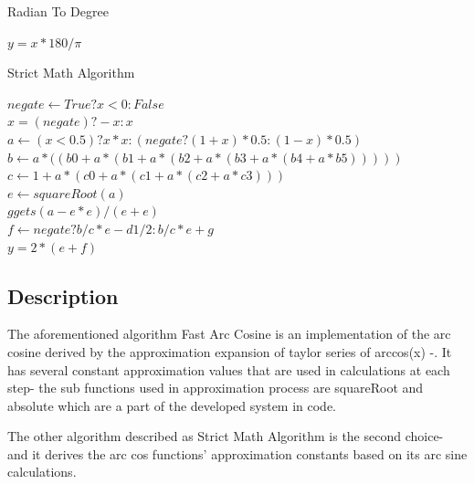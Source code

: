 \documentclass[a4paper,12pt]{article}
\begin{document}
    \begin{algorithm}
    \caption{Radian To Degree}
    $y = x * 180/\pi$\;
    \end{algorithm}
    
    \begin{algorithm}
    \caption{Strict Math Algorithm \cite{Strict Math}}
    $negate \gets True ? x < 0 : False$\\
    $x = (negate) ? -x: x$\\
   $a \gets (x < 0.5) ? x*x : (negate ? (1+x)*0.5 : (1-x)*0.5)$
   \\
   $b \gets a * ((b0 + a * (b1 + a * (b2 + a * (b3 + a * (b4 + a * b5))))) $
   \\
   $c \gets 1 + a * (c0 + a * (c1 + a * (c2 + a * c3)))$ 
   \newline    
   \\
   $e \gets squareRoot(a)$\\
   $g gets (a - e * e) / (e + e)$\\
   $f \gets negate ? b / c * e - d1 / 2 : b / c * e + g$
   \\
   $y = 2 * (e + f)$
    \end{algorithm} 
    
\subsection{Description}
    The aforementioned algorithm Fast Arc Cosine is an implementation of the arc cosine derived by the approximation expansion of taylor series of arccos(x) -\cite{Abramowitz Book}. It has several constant approximation values that are used in calculations at each step- the sub functions used in approximation process are squareRoot and absolute which are a part of the developed system in code.
    
    The other algorithm described as Strict Math Algorithm \cite{Strict Math} is the second choice- and it derives the arc cos functions' approximation constants based on its arc sine calculations.
\end{document}
